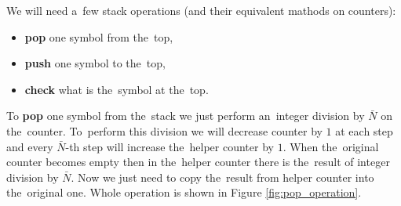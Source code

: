 \documentclass[english,shortabstract,mgr]{iithesis}
\begin{document}
We will need a~few stack operations (and their equivalent
mathods on counters):
\begin{itemize}
  \item \textbf{pop} one symbol from the~top,
  \item \textbf{push} one symbol to the~top,
  \item \textbf{check} what is the~symbol at the~top.
\end{itemize}

To \textbf{pop} one symbol from the~stack we just perform an~integer division by $\bar{N}$ on
the~counter. To~perform this division we will decrease counter by $1$ at each step and every
$\bar{N}$-th step will increase the~helper counter by $1$. When the~original counter becomes empty
then in the~helper counter there is the~result of integer division by $\bar{N}$. Now we just
need to copy the~result from helper counter into the~original one. Whole operation is shown in
Figure \ref{fig:pop_operation}.
\end{document}
